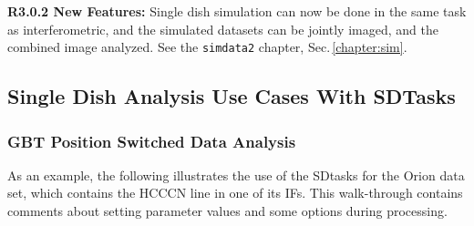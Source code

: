 {\bf R3.0.2 New Features:}
Single dish simulation can now be done in the same task as
interferometric, and the simulated datasets can be jointly imaged, and
the combined image analyzed.  See the {\tt simdata2} chapter, Sec.\,\ref{chapter:sim}.

\subsection{Single Dish Analysis Use Cases With SDTasks}
\label{section:sd.sdtasks.usecase}

\subsubsection{GBT Position Switched Data Analysis}
As an example, the following illustrates the use of the SDtasks for
the Orion data set, which contains the HCCCN line in one of its IFs.
This walk-through contains comments about setting parameter values
and some options during processing.

